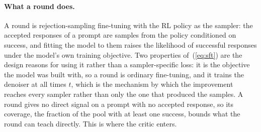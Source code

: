 \paragraph{What a round does.}
A round is rejection-sampling fine-tuning \citep{yuan2023rft,singh2023restem,zelikman2022star} with the RL policy as the sampler: the accepted responses of a prompt are samples from the policy conditioned on success, and fitting the model to them raises the likelihood of successful responses under the model's own training objective. Two properties of~(\ref{eq:sft}) are the design reasons for using it rather than a sampler-specific loss: it is the objective the model was built with, so a round is ordinary fine-tuning, and it trains the denoiser at all times $t$, which is the mechanism by which the improvement reaches every sampler rather than only the one that produced the samples. A round gives no direct signal on a prompt with no accepted response, so its coverage, the fraction of the pool with at least one success, bounds what the round can teach directly. This is where the critic enters.

